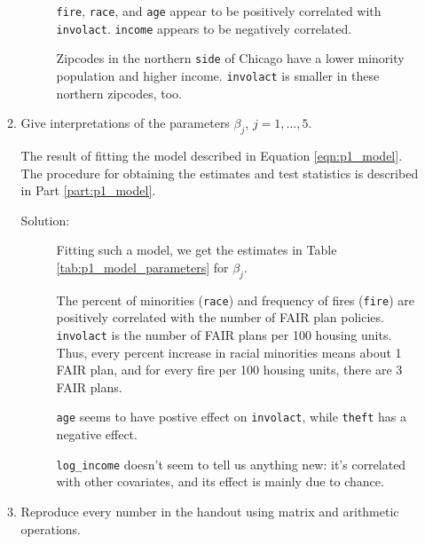 \documentclass[letterpaper,11pt]{article}
\begin{document}
\begin{enumerate}
\begin{enumerate}
\begin{description}
      \texttt{fire}, \texttt{race}, and \texttt{age} appear to be positively
      correlated with \texttt{involact}. \texttt{income} appears to be
      negatively correlated.

      Zipcodes in the northern \texttt{side} of Chicago have a lower minority
      population and higher income. \texttt{involact} is smaller in these
      northern zipcodes, too.
    \end{description}
  \item Give interpretations of the parameters $\beta_j$, $j = 1,\ldots,5$.

    \begin{table}
      \centering
      
      \caption{The result of fitting the model described in Equation
        \ref{eqn:p1_model}. The procedure for obtaining the estimates and test
        statistics is described in Part \ref{part:p1_model}.}
      \label{tab:p1_model_parameters}
    \end{table}          

    \begin{description}
    \item[Solution:] Fitting such a model, we get the estimates in Table
      \ref{tab:p1_model_parameters} for $\beta_j$.

      The percent of minorities (\texttt{race}) and frequency of fires
      (\texttt{fire}) are positively correlated with the number of FAIR plan
      policies. \texttt{involact} is the number of FAIR plans per 100 housing
      units. Thus, every percent increase in racial minorities means about 1
      FAIR plan, and for every fire per 100 housing units, there are 3 FAIR
      plans.

      \texttt{age} seems to have postive effect on \texttt{involact}, while
      \texttt{theft} has a negative effect.

      \texttt{log\_income} doesn't seem to tell us anything new: it's correlated
      with other covariates, and its effect is mainly due to chance.      
    \end{description}
    
  \item Reproduce every number in the handout using matrix and arithmetic
    operations.
    \label{part:p1_model}


\end{enumerate}
\end{enumerate}
\end{document}
